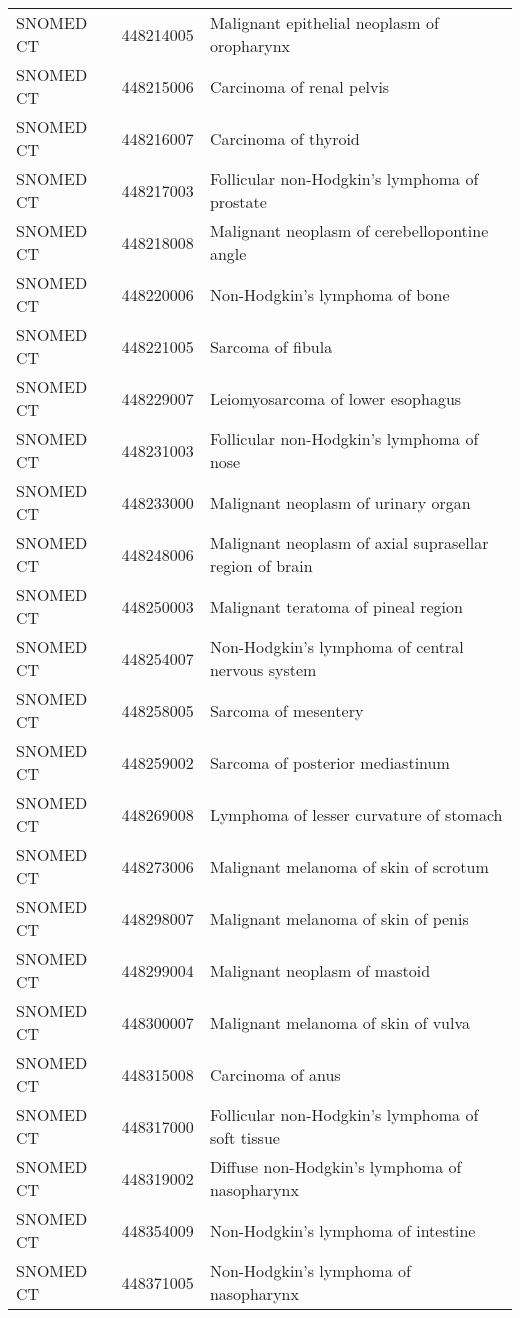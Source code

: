 \begin{longtable}{p{}p{}p{}}
  SNOMED CT & 448214005 & Malignant epithelial neoplasm of oropharynx \\ 
  SNOMED CT & 448215006 & Carcinoma of renal pelvis \\ 
  SNOMED CT & 448216007 & Carcinoma of thyroid \\ 
  SNOMED CT & 448217003 & Follicular non-Hodgkin's lymphoma of prostate \\ 
  SNOMED CT & 448218008 & Malignant neoplasm of cerebellopontine angle \\ 
  SNOMED CT & 448220006 & Non-Hodgkin's lymphoma of bone \\ 
  SNOMED CT & 448221005 & Sarcoma of fibula \\ 
  SNOMED CT & 448229007 & Leiomyosarcoma of lower esophagus \\ 
  SNOMED CT & 448231003 & Follicular non-Hodgkin's lymphoma of nose \\ 
  SNOMED CT & 448233000 & Malignant neoplasm of urinary organ \\ 
  SNOMED CT & 448248006 & Malignant neoplasm of axial suprasellar region of brain \\ 
  SNOMED CT & 448250003 & Malignant teratoma of pineal region \\ 
  SNOMED CT & 448254007 & Non-Hodgkin's lymphoma of central nervous system \\ 
  SNOMED CT & 448258005 & Sarcoma of mesentery \\ 
  SNOMED CT & 448259002 & Sarcoma of posterior mediastinum \\ 
  SNOMED CT & 448269008 & Lymphoma of lesser curvature of stomach \\ 
  SNOMED CT & 448273006 & Malignant melanoma of skin of scrotum \\ 
  SNOMED CT & 448298007 & Malignant melanoma of skin of penis \\ 
  SNOMED CT & 448299004 & Malignant neoplasm of mastoid \\ 
  SNOMED CT & 448300007 & Malignant melanoma of skin of vulva \\ 
  SNOMED CT & 448315008 & Carcinoma of anus \\ 
  SNOMED CT & 448317000 & Follicular non-Hodgkin's lymphoma of soft tissue \\ 
  SNOMED CT & 448319002 & Diffuse non-Hodgkin's lymphoma of nasopharynx \\ 
  SNOMED CT & 448354009 & Non-Hodgkin's lymphoma of intestine \\ 
  SNOMED CT & 448371005 & Non-Hodgkin's lymphoma of nasopharynx \\ 

\end{longtable}
